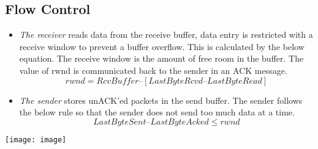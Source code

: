 \documentclass{article}
\begin{document}
\subsection{Flow Control}
\begin{itemize}
    \item 
        \textit{The receiver} reads data from the receive buffer, data entry is restricted with a receive window
        to prevent a buffer overflow. This is calculated by the below equation.
        The receive window is the amount of free room in the buffer. The value of rwnd is communicated back to
        the sender in an ACK message.
        \[rwnd = RcvBuffer – [LastByteRcvd – LastByteRead]\]
    \item
        \textit{The sender} stores unACK'ed packets in the send buffer. The sender follows the below rule 
        so that the sender does not send too much data at a time.
        \[LastByteSent – LastByteAcked \leq rwnd\] 
\end{itemize}

\texttt{[image: image]}
\end{document}
